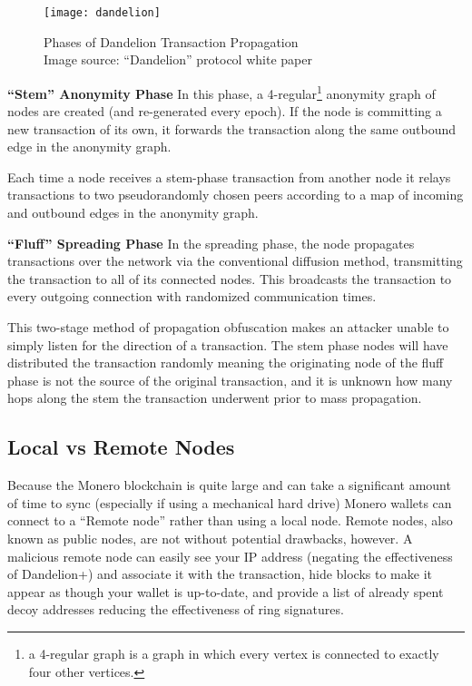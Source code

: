 \begin{figure}[H]
    \centering
    \texttt{[image: dandelion]}
    \caption{
        Phases of Dandelion Transaction Propagation\\
        Image source: ``Dandelion'' protocol white paper\cite{dandelion_original} 
    }
    \label{fig:dandelion}
\end{figure}

\noindent\textbf{``Stem'' Anonymity Phase}
In this phase, a 4-regular\footnote{a 4-regular graph is a graph in which every vertex is connected to exactly four other vertices.} anonymity graph of nodes are created (and re-generated every epoch)\cite{dandelion}. If the node is committing a new transaction of its own, it forwards the transaction along the same outbound edge in the anonymity graph\cite{localmonero-dandelion}.

Each time a node receives a stem-phase transaction from another node it relays transactions to two pseudorandomly chosen peers according to a map of incoming and outbound edges in the anonymity graph\cite{dandelion}.

\medskip
\noindent\textbf{``Fluff'' Spreading Phase}
In the spreading phase, the node propagates transactions over the network via the conventional diffusion method, transmitting the transaction to all of its connected nodes. This broadcasts the transaction to every outgoing connection with randomized communication times\cite{dandelion_original}.

\medskip
This two-stage method of propagation obfuscation makes an attacker unable to simply listen for the direction of a transaction. The stem phase nodes will have distributed the transaction randomly meaning the originating node of the fluff phase is not the source of the original transaction, and it is unknown how many hops along the stem the transaction underwent prior to mass propagation\cite{localmonero-dandelion}.


\subsection{Local vs Remote Nodes}
Because the Monero blockchain is quite large and can take a significant amount of time to sync (especially if using a mechanical hard drive) Monero wallets can connect to a ``Remote node'' rather than using a local node\cite{moneropedia}. Remote nodes, also known as public nodes, are not without potential drawbacks, however. A malicious remote node can easily see your IP address (negating the effectiveness of Dandelion+) and associate it with the transaction, hide blocks to make it appear as though your wallet is up-to-date, and provide a list of already spent decoy addresses reducing the effectiveness of ring signatures\cite{localmonero-remotenode}.

